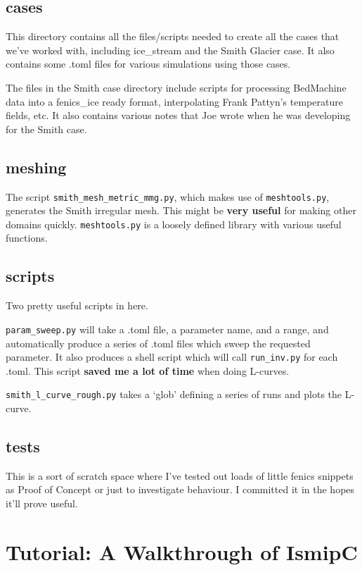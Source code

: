 \documentclass[11pt, reqno, nocenter]{article}
\begin{document}
\subsection{cases}

This directory contains all the files/scripts needed to create all the cases that we've worked with, including ice\_stream and the Smith Glacier case. It also contains some .toml files for various simulations using those cases.

The files in the Smith case directory include scripts for processing BedMachine data into a fenics\_ice ready format, interpolating Frank Pattyn's temperature fields, etc. It also contains various notes that Joe wrote when he was developing for the Smith case.

\subsection{meshing}

The script {\tt smith\_mesh\_metric\_mmg.py}, which makes use of {\tt meshtools.py}, generates the Smith irregular mesh. This might be \textbf{very useful} for making other domains quickly. {\tt meshtools.py} is a loosely defined library with various useful functions.

\subsection{scripts}

Two pretty useful scripts in here.

{\tt param\_sweep.py} will take a .toml file, a parameter name, and a range, and automatically produce a series of .toml files which sweep the requested parameter. It also produces a shell script which will call {\tt run\_inv.py} for each .toml. This script \textbf{saved me a lot of time} when doing L-curves.

{\tt smith\_l\_curve\_rough.py} takes a `glob' defining a series of runs and plots the L-curve.

\subsection{tests}

This is a sort of scratch space where I've tested out loads of little fenics snippets as Proof of Concept or just to investigate behaviour. I committed it in the hopes it'll prove useful.

\section{Tutorial: A Walkthrough of IsmipC}
\end{document}
